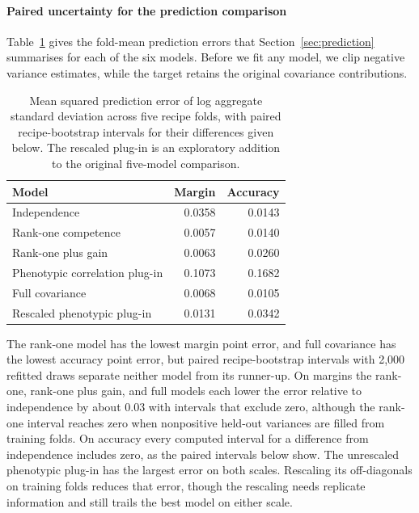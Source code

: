 \paragraph{Paired uncertainty for the prediction comparison}\label{app:paired}
Table~\ref{tab:prediction} gives the fold-mean prediction errors that Section~\ref{sec:prediction} summarises for each of the six models. Before we fit any model, we clip negative variance estimates, while the target retains the original covariance contributions.

\begin{table}[!htb]
\centering
\caption{Mean squared prediction error of log aggregate standard deviation across five recipe folds, with paired recipe-bootstrap intervals for their differences given below. The rescaled plug-in is an exploratory addition to the original five-model comparison.}
\label{tab:prediction}
\small\setlength{\tabcolsep}{4pt}\renewcommand{\arraystretch}{1.12}
\begin{tabular}{lrr}
\toprule
Model & Margin & Accuracy\\
\midrule
Independence & 0.0358 & 0.0143\\
Rank-one competence & 0.0057 & 0.0140\\
Rank-one plus gain & 0.0063 & 0.0260\\
Phenotypic correlation plug-in & 0.1073 & 0.1682\\
Full covariance & 0.0068 & 0.0105\\
Rescaled phenotypic plug-in & 0.0131 & 0.0342\\
\bottomrule
\end{tabular}
\end{table}

The rank-one model has the lowest margin point error, and full covariance has the lowest accuracy point error, but paired recipe-bootstrap intervals with 2,000 refitted draws separate neither model from its runner-up. On margins the rank-one, rank-one plus gain, and full models each lower the error relative to independence by about 0.03 with intervals that exclude zero, although the rank-one interval reaches zero when nonpositive held-out variances are filled from training folds. On accuracy every computed interval for a difference from independence includes zero, as the paired intervals below show. The unrescaled phenotypic plug-in has the largest error on both scales. Rescaling its off-diagonals on training folds reduces that error, though the rescaling needs replicate information and still trails the best model on either scale.


